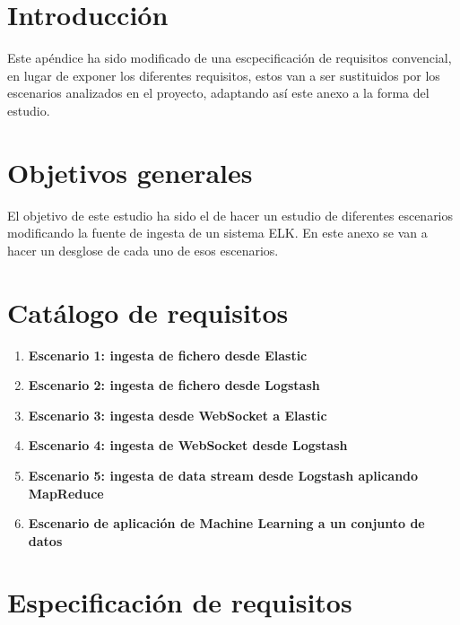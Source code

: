 
\section{Introducción}

Este apéndice ha sido modificado de una escpecificación de requisitos convencial, en lugar de exponer los diferentes requisitos, estos van a ser sustituidos por los escenarios analizados en el proyecto, adaptando así este anexo a la forma del estudio.


\section{Objetivos generales}
El objetivo de este estudio ha sido el de hacer un estudio de diferentes escenarios modificando la fuente de ingesta de un sistema ELK. En este anexo se van a hacer un desglose de cada uno de esos escenarios.

\section{Catálogo de requisitos}
\begin{enumerate}
    \item \textbf{Escenario 1: ingesta de fichero desde Elastic }
    \item \textbf{Escenario 2: ingesta de fichero desde Logstash }
    \item \textbf{Escenario 3: ingesta desde WebSocket a Elastic }
    \item \textbf{Escenario 4: ingesta de WebSocket desde Logstash }
    \item \textbf{Escenario 5: ingesta de data stream desde Logstash aplicando MapReduce }
    \item \textbf{Escenario de aplicación de Machine Learning a un conjunto de datos}
\end{enumerate}


\section{Especificación de requisitos}

